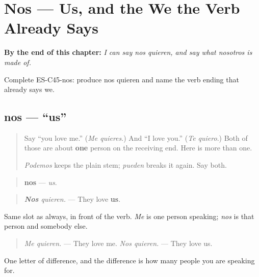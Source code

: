 
\chapter{Nos --- Us, and the We the Verb Already Says}
\label{ch:pronoun-nos}

\begin{chapteropening}
\textbf{By the end of this chapter:} \emph{I can say nos quieren, and say what nosotros is made of.}

Complete ES-C45-nos: produce nos quieren and name the verb ending that already says we.
\end{chapteropening}

\section[nos]{nos — \textquotedblleft{}us\textquotedblright{}}

\label{lesson:ES-C45-nos}



\begin{quote}
Say \textquotedblleft{}you love me.\textquotedblright{} (\emph{Me quieres}.) And \textquotedblleft{}I love you.\textquotedblright{} (\emph{Te quiero}.) Both of those are about \textbf{one} person on the receiving end. Here is more than one.

\emph{Podemos} keeps the plain stem; \emph{pueden} breaks it again. Say both.
\end{quote}

\begin{grammarlens}[title={Grammar Lens: the third person in the room}]
\begin{quote}
\textbf{nos} — \emph{us}.
\end{quote}

\begin{quote}
\emph{\textbf{Nos} quieren.} — They love \textbf{us}.
\end{quote}

Same slot as always, in front of the verb. \emph{Me} is one person speaking; \emph{nos} is that person and somebody else.

\begin{quote}
\emph{Me quieren.} — They love me. \emph{Nos quieren.} — They love us.
\end{quote}

One letter of difference, and the difference is how many people you are speaking for.
\end{grammarlens}

